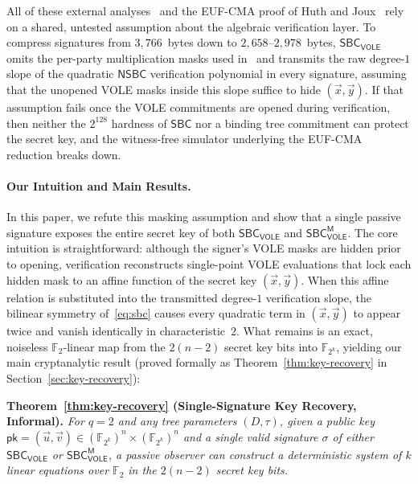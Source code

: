 \documentclass[11pt,a4paper]{article}
\theoremstyle{definition}
\theoremstyle{remark}
\newcommand{\Ftwo}{\mathbb{F}_2}
\newcommand{\Ftwok}{\mathbb{F}_{2^k}}
\newcommand{\SBC}{\mathsf{SBC}}
\newcommand{\NSBC}{\mathsf{NSBC}}
\newcommand{\SBCVOLE}{\mathsf{SBC}_{\mathsf{VOLE}}}
\newcommand{\SBCVOLEM}{\mathsf{SBC}_{\mathsf{VOLE}}^{\mathsf{M}}}
\newcommand{\pk}{\mathsf{pk}}
\begin{document}
All of these external analyses~\cite{KLS25,BN26,KX26,FR26} and the EUF-CMA proof of Huth and Joux~\cite[Theorem~2]{HJ25} rely on a shared, untested assumption about the algebraic verification layer. To compress signatures from $3{,}766$~bytes down to $2{,}658$--$2{,}978$~bytes, $\SBCVOLE$ omits the per-party multiplication masks used in~\cite{HJ24} and transmits the raw degree-$1$ slope of the quadratic $\NSBC$ verification polynomial in every signature, assuming that the unopened VOLE masks inside this slope suffice to hide $(\vec{x}, \vec{y})$. If that assumption fails once the VOLE commitments are opened during verification, then neither the $2^{128}$ hardness of $\SBC$ nor a binding tree commitment can protect the secret key, and the witness-free simulator underlying the EUF-CMA reduction breaks down.

\paragraph{Our Intuition and Main Results.}
In this paper, we refute this masking assumption and show that a single passive signature exposes the entire secret key of both $\SBCVOLE$ and $\SBCVOLEM$. The core intuition is straightforward: although the signer's VOLE masks are hidden prior to opening, verification reconstructs single-point VOLE evaluations that lock each hidden mask to an affine function of the secret key $(\vec{x}, \vec{y})$. When this affine relation is substituted into the transmitted degree-$1$ verification slope, the bilinear symmetry of~\eqref{eq:sbc} causes every quadratic term in $(\vec{x}, \vec{y})$ to appear twice and vanish identically in characteristic~$2$. What remains is an exact, noiseless $\Ftwo$-linear map from the $2(n-2)$ secret key bits into $\Ftwok$, yielding our main cryptanalytic result (proved formally as Theorem~\ref{thm:key-recovery} in Section~\ref{sec:key-recovery}):

\medskip
\noindent\textbf{Theorem~\ref{thm:key-recovery} (Single-Signature Key Recovery, Informal).}
\emph{For $q = 2$ and any tree parameters $(D, \tau)$, given a public key $\pk = (\vec{u}, \vec{v}) \in (\Ftwok)^n \times (\Ftwok)^n$ and a single valid signature $\sigma$ of either $\SBCVOLE$ or $\SBCVOLEM$, a passive observer can construct a deterministic system of $k$ linear equations over $\Ftwo$ in the $2(n-2)$ secret key bits.}
\medskip
\end{document}
